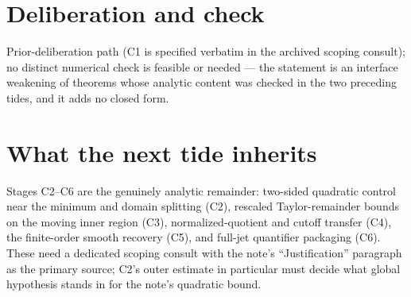 \documentclass[11pt]{article}
\begin{document}
\section{Deliberation and check}

Prior-deliberation path (C1 is specified verbatim in the archived
scoping consult); no distinct numerical check is feasible or needed
--- the statement is an interface weakening of theorems whose
analytic content was checked in the two preceding tides, and it adds
no closed form.

\section{What the next tide inherits}

Stages C2--C6 are the genuinely analytic remainder: two-sided
quadratic control near the minimum and domain splitting (C2),
rescaled Taylor-remainder bounds on the moving inner region (C3),
normalized-quotient and cutoff transfer (C4), the finite-order smooth
recovery (C5), and full-jet quantifier packaging (C6). These need a
dedicated scoping consult with the note's ``Justification'' paragraph
as the primary source; C2's outer estimate in particular must decide
what global hypothesis stands in for the note's quadratic bound.
\end{document}
